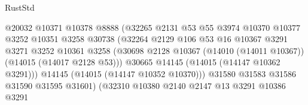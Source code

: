 \begin{lexlean}{RustStd}
\begin{coremodule}
                                          @20032
                                          @10371
                                          @10378
                                          @8888
                                          (@32265
                                            @2131
                                            @53
                                            @55
                                            @3974
                                            @10370
                                            @10377
                                            @3252
                                            @10351
                                            @3258
                                            @30738
                                            (@32264
                                              @2129
                                              @106
                                              @53
                                              @16
                                              @10367
                                              @3291
                                              @3271
                                              @3252
                                              @10361
                                              @3258
                                              (@30698
                                                @2128
                                                @10367
                                                (@14010 (@14011 @10367))
                                                (@14015 (@14017 @2128 @53)))
                                              @30665
                                              @14145
                                              (@14015 (@14147 @10362 @3291)))
                                            @14145
                                            (@14015 (@14147 @10352 @10370)))
                                          @31580
                                          @31583
                                          @31586
                                          @31590
                                          @31595
                                          @31601)
                                        (@32310
                                          @10380
                                          @2140
                                          @2147
                                          @13
                                          @3291
                                          @10386
                                          @3291

\end{coremodule}
\end{lexlean}
